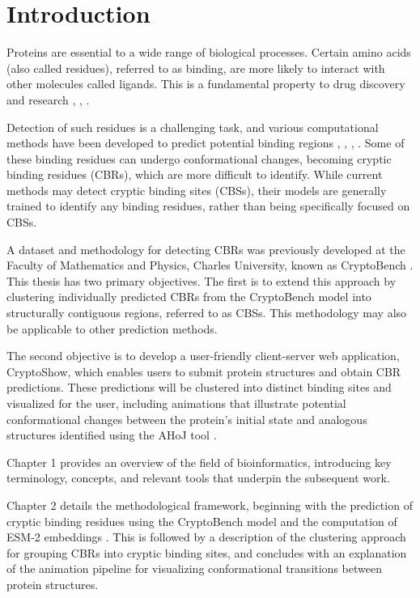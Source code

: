 \chapter*{Introduction}

Proteins are essential to a wide range of biological processes. Certain amino acids (also called residues), referred to as binding, are more likely to interact with other molecules called ligands. This is a fundamental property to drug discovery and research \cite{trainor2007importance}, \cite{ballante2021protein}, \cite{mannhold2006protein}. 

Detection of such residues is a challenging task, and various computational methods have been developed to predict potential binding regions \cite{krivak2018p2rank}, \cite{le2009fpocket}, \cite{aggarwal2021deeppocket}, \cite{smith2024graph}. Some of these binding residues can undergo conformational changes, becoming cryptic binding residues (CBRs), which are more difficult to identify. While current methods may detect cryptic binding sites (CBSs), their models are generally trained to identify any binding residues, rather than being specifically focused on CBSs.

A dataset and methodology for detecting CBRs was previously developed at the Faculty of Mathematics and Physics, Charles University, known as CryptoBench \cite{vskrhak2025cryptobench}. This thesis has two primary objectives. The first is to extend this approach by clustering individually predicted CBRs from the CryptoBench model into structurally contiguous regions, referred to as CBSs. This methodology may also be applicable to other prediction methods.

The second objective is to develop a user-friendly client-server web application, CryptoShow, which enables users to submit protein structures and obtain CBR predictions. These predictions will be clustered into distinct binding sites and visualized for the user, including animations that illustrate potential conformational changes between the protein's initial state and analogous structures identified using the AHoJ tool \cite{feidakis2022ahoj}.

Chapter 1 provides an overview of the field of bioinformatics, introducing key terminology, concepts, and relevant tools that underpin the subsequent work.

Chapter 2 details the methodological framework, beginning with the prediction of cryptic binding residues using the CryptoBench model and the computation of ESM-2 embeddings \cite{lin2022language}. This is followed by a description of the clustering approach for grouping CBRs into cryptic binding sites, and concludes with an explanation of the animation pipeline for visualizing conformational transitions between protein structures.

